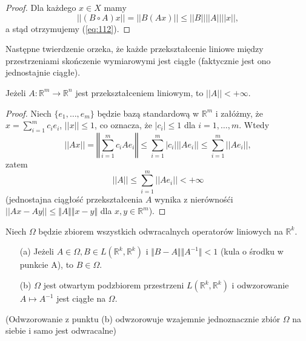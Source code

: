 \documentclass[leqno]{article}
\begin{document}
\begin{justify}
\begin{proof}
    Dla każdego $x \in X$ mamy 
    \[
        ||(B \circ A)x|| = ||B(Ax)|| \leqslant ||B|| ||A|| ||x||,
    \]
    a stąd otrzymujemy (\ref{eq:112}).
\end{proof}

Następne twierdzenie orzeka, że każde przekształcenie liniowe między przestrzeniami skończenie wymiarowymi jest ciągłe (faktycznie jest ono jednostajnie ciągłe).

\begin{theorem}
{
    Jeżeli $A : \mathbb{R}^m \to \mathbb{R}^n$ jest przekształceniem liniowym, to $||A|| < +\infty$.
}
\end{theorem}

\begin{proof}
    Niech $\{e_1, \ldots, e_m \}$ będzie bazą standardową w $\mathbb{R}^m$ i załóżmy, że
    $x = \sum_{i=1}^{m}c_i e_i$, $||x|| \leqslant 1$, co oznacza, że $|c_i| \leqslant 1$ dla $i = 1, \ldots, m$.
    Wtedy 
    \[
        ||A x || = \left \Vert \sum\limits_{i=1}^{m}c_i A e_i \right \Vert \leqslant \sum\limits_{i=1}^{m}|c_i| ||A e_i|| \leqslant \sum\limits_{i=1}^{m} || A e_i ||,
    \]    
    zatem 
    \[
        ||A|| \leqslant \sum\limits_{i=1}^{m}||A e_i|| < +\infty
    \]
    (jednostajna ciągłość przekształcenia $A$ wynika z nierównośći $||Ax - Ay|| \leqslant \Vert A \Vert \Vert x - y \Vert$ 
    dla $x, y \in \mathbb{R}^m$).
\end{proof}

\begin{theorem}
{
    Niech $\Omega$ będzie zbiorem wszystkich odwracalnych operatorów liniowych na $\mathbb{R}^k$.
    \begin{itemize}
        \item [(a)] Jeżeli $A \in \Omega, B \in L(\mathbb{R}^k, \mathbb{R}^k)$ i $ \Vert B - A \Vert \Vert A^{-1} \Vert < 1$ (kula o środku w punkcie A), to $B \in \Omega$.
        \item [(b)] $\Omega$ jest otwartym podzbiorem przestrzeni $L(\mathbb{R}^k, \mathbb{R}^k)$ i odwzorowanie $A \mapsto A^{-1}$ jest ciągłe na $\Omega$. 
    \end{itemize}
    (Odwzorowanie z punktu (b) odwzorowuje wzajemnie jednoznacznie zbiór $\Omega$ na siebie i samo jest odwracalne)
}
\end{theorem}


\end{justify}
\end{document}
